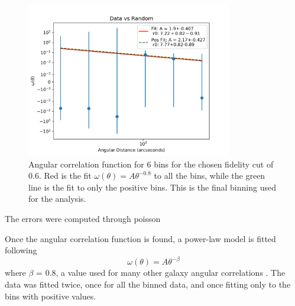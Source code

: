 \begin{figure}[!tbp]
\centering \includegraphics[width=90mm]{clustering_two/Data_vs_Random_10000_bin6_sn0_6_NFalse.png}
\caption{Angular correlation function for 6 bins for the chosen fidelity cut of 0.6. Red is the fit $\omega(\theta) = A\theta^{-0.8}$ to all the bins, while the green line is the fit to only the positive bins. This is the final binning used for the analysis. }
\label{fig:Angular_binnings}
\end{figure}


The errors were computed through poisson 


Once the angular correlation function is found, a power-law model is fitted following $$\omega(\theta) = A\theta^{-\beta} $$ where $\beta$ = 0.8, a value used for many other galaxy angular correlations \cite{hickox2011clustering}. The data was fitted twice, once for all the binned data, and once fitting only to the bins with positive values.



